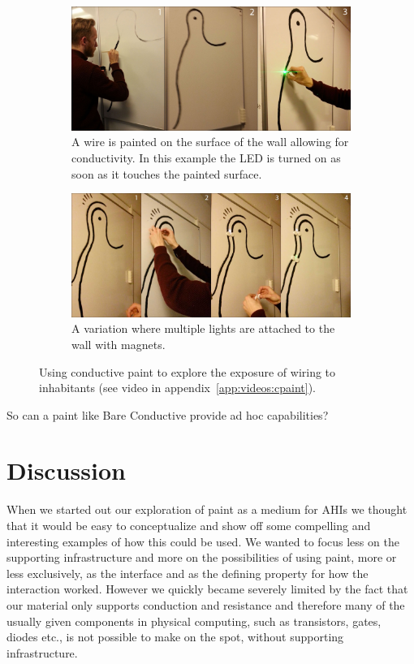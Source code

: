 \begin{figure}[h]
  \centering
  \begin{subfigure}[t]{.9\textwidth}
    \centering
    \includegraphics[width=.9\textwidth]{figures/proto3/wallpaint-1}
    \caption{A wire is painted on the surface of the wall allowing for conductivity. In this example the LED is turned on as soon as it touches the painted surface.}
  \end{subfigure}
  \begin{subfigure}[t]{.9\textwidth}
    \vspace{0.2cm}
    \centering
    \includegraphics[width=.9\textwidth]{figures/proto3/wallpaint-2}
    \caption{A variation where multiple lights are attached to the wall with magnets.}
  \end{subfigure}
  \caption{Using conductive paint to explore the exposure of wiring to inhabitants (see video in appendix~\ref{app:videos:cpaint}).}
  \label{fig:ch:proto3:wallpaint}
\end{figure}

So can a paint like Bare Conductive provide ad hoc capabilities?

\section{Discussion}
When we started out our exploration of paint as a medium for AHIs we thought that it would be easy to conceptualize and show off some compelling and interesting examples of how this could be used.
We wanted to focus less on the supporting infrastructure and more on the possibilities of using paint, more or less exclusively, as the interface and as the defining property for how the interaction worked. 
However we quickly became severely limited by the fact that our material only supports conduction and resistance and therefore many of the usually given components in physical computing, such as transistors, gates, diodes etc., is not possible to make on the spot, without supporting infrastructure.  

